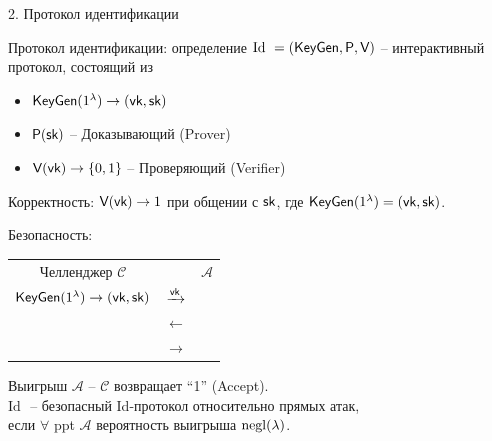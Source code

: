 \documentclass[usenames,dvipsnames,8pt,aspectratio=169]{beamer}
\begin{document}
\begin{frame}

\begin{LARGE}
	
	
	\color{Orange}
	2. Протокол идентификации
	
\end{LARGE}
\end{frame}

\begin{frame}{Протокол идентификации:  определение}
\Large
$\text{Id } = (\textsf{KeyGen}, \textsf{P}, \textsf{V})$ -- интерактивный протокол, состоящий из 

\begin{itemize}
	\itemsep 7pt
	\item $\textsf{KeyGen}(1^\lambda) \rightarrow (\textsf{vk}, \textsf{sk})$ 
	\item $\textsf{P}(\textsf{sk})$ -- Доказывающий (Prover)
	\item $\textsf{V}(\textsf{vk}) \rightarrow \{0,1\}$ -- Проверяющий (Verifier)
\end{itemize}

\vspace{10pt}

{\color{Orange} Корректность:} $\textsf{V}(\textsf{vk}) \rightarrow 1$ при общении с $\textsf{\textsf{sk}}$, где $\textsf{KeyGen}(1^\lambda) = (\textsf{vk}, \textsf{sk})$.

\vspace{10pt}

{\color{Orange} Безопасность:}
\begin{tabular}{c c c}
	{\color{Orange} Челленджер $\mathcal{C}$ } & & {\color{Orange} $\mathcal{A}$ } \\ 
	$\textsf{KeyGen}(1^\lambda) \rightarrow (\textsf{vk}, \textsf{sk})$ & $\xrightarrow{\textsf{vk}}$ & \\[5pt]
	 & $\leftarrow$ & \\[-2pt]
	 & $\rightarrow$ & \\[2pt]
	
\end{tabular}
\vspace{10pt}

Выигрыш $\mathcal{A}$ --  $\mathcal{C}$ возвращает ``1'' (Accept). \\[5pt]

$\text{Id }$ -- безопасный Id-протокол относительно прямых атак,  \\ если $\forall $ ppt $\mathcal{A}$  вероятность выигрыша  $\mathrm{negl}(\lambda)$.

\end{frame}
\end{document}

